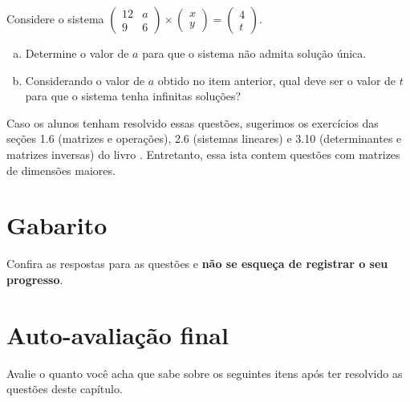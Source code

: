 \documentclass[main_estudante.tex]{subfiles}
\begin{document}
\begin{adicional}
Considere o sistema $\begin{pmatrix}12 & a \\ 9 & 6\end{pmatrix} \times \begin{pmatrix}x \\ y\end{pmatrix} = \begin{pmatrix}4 \\ t\end{pmatrix}$.
\begin{enumerate}[a)]
\item Determine o valor de $a$ para que o sistema não admita solução única.
\item Considerando o valor de $a$ obtido no item anterior, qual deve ser o valor de $t$ para que o sistema tenha infinitas soluções?
\end{enumerate}
\end{adicional}

Caso os alunos tenham resolvido essas questões, sugerimos os exercícios das seções 1.6 (matrizes e operações), 2.6 (sistemas lineares) e 3.10 (determinantes e matrizes inversas) do livro . Entretanto, essa ista contem questões com matrizes de dimensões maiores.

\paraAmbos


\newpage

\section{Gabarito}

Confira as respostas para as questões e \textbf{não se esqueça de registrar o seu progresso}.

\imprimeGabarito

\paraAlunos

\section{Auto-avaliação final}
Avalie o quanto você acha que sabe sobre os seguintes itens após ter resolvido as questões deste capítulo.
\end{document}
